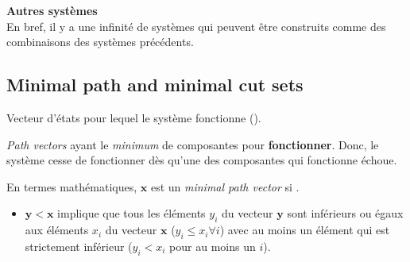 \documentclass[french]{article}
\begin{document}
\begin{multicols*}{2}
\begin{definitionNOHFILL}
\begin{center}
\end{center}
\end{definitionNOHFILL}

\textbf{Autres systèmes}	\\
En bref, il y a une infinité de systèmes qui peuvent être construits comme des combinaisons des systèmes précédents.


\columnbreak
\subsection{Minimal path and minimal cut sets}
\begin{definitionNOHFILL}
Vecteur d'états pour lequel le système fonctionne (). 
\end{definitionNOHFILL}

\begin{definitionNOHFILLsub}
\og \textit{Path vectors} \fg{} ayant le \textit{minimum} de composantes pour \textbf{fonctionner}. Donc, le système cesse de fonctionner dès qu'une des composantes qui fonctionne échoue. 

\bigskip

En termes mathématiques, $\bm{x}$ est un \og \textit{minimal path vector} \fg{} si . 
\begin{itemize}
	\item	$\bm{y} < \bm{x}$ implique que tous les éléments $y_{i}$ du vecteur $\bm{y}$ sont inférieurs ou égaux aux éléments $x_{i}$ du vecteur $\bm{x}$ ($y_{i} \leq x_{i} \forall i$) avec au moins un élément qui est strictement inférieur ($y_{i} < x_{i}$ pour au moins un $i$).
\end{itemize}
\end{definitionNOHFILLsub}
 

\end{multicols*}
\end{document}

